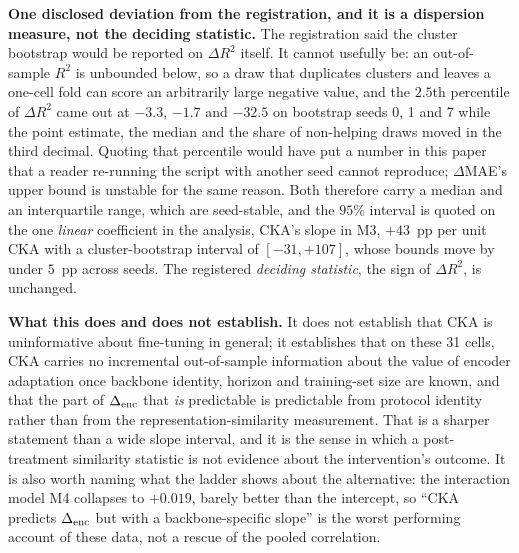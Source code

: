 \textbf{One disclosed deviation from the registration, and it is a dispersion
measure, not the deciding statistic.}  The registration said the cluster bootstrap
would be reported on $\Delta R^2$ itself.  It cannot usefully be: an out-of-sample
$R^2$ is unbounded below, so a draw that duplicates clusters and leaves a one-cell
fold can score an arbitrarily large negative value, and the $2.5$th percentile of
$\Delta R^2$ came out at $-3.3$, $-1.7$ and $-32.5$ on bootstrap seeds 0, 1 and 7
while the point estimate, the median and the share of non-helping draws moved in
the third decimal.  Quoting that percentile would have put a number in this paper
that a reader re-running the script with another seed cannot reproduce; $\Delta$MAE's
upper bound is unstable for the same reason.  Both therefore carry a median and an
interquartile range, which are seed-stable, and the $95\%$ interval is quoted on the
one \emph{linear} coefficient in the analysis, CKA's slope in M3, $+43$~pp per unit
CKA with a cluster-bootstrap interval of $[-31, +107]$, whose bounds move by under
$5$~pp across seeds.  The registered \emph{deciding statistic}, the sign of
$\Delta R^2$, is unchanged.



\textbf{What this does and does not establish.}  It does not establish that CKA is
uninformative about fine-tuning in general; it establishes that on these 31 cells,
CKA carries no incremental out-of-sample information about the value of encoder
adaptation once backbone identity, horizon and training-set size are known, and
that the part of $\Delta_\text{enc}$ that \emph{is} predictable is predictable from protocol
identity rather than from the representation-similarity measurement.  That is a
sharper statement than a wide slope interval, and it is the sense in which a
post-treatment similarity statistic is not evidence about the intervention's
outcome.  It is also worth naming what the ladder shows about the alternative:
the interaction model M4 collapses to $+0.019$, barely better than the intercept,
so ``CKA predicts $\Delta_\text{enc}$ but with a backbone-specific slope'' is the worst
performing account of these data, not a rescue of the pooled correlation.

